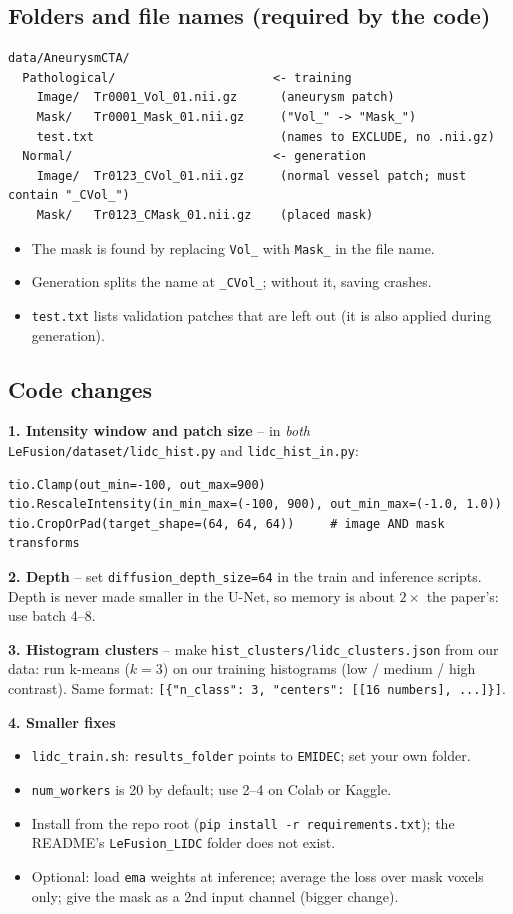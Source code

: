 \documentclass[11pt,a4paper]{article}
\begin{document}
\subsection{Folders and file names (required by the code)}
\begin{verbatim}
data/AneurysmCTA/
  Pathological/                      <- training
    Image/  Tr0001_Vol_01.nii.gz      (aneurysm patch)
    Mask/   Tr0001_Mask_01.nii.gz     ("Vol_" -> "Mask_")
    test.txt                          (names to EXCLUDE, no .nii.gz)
  Normal/                            <- generation
    Image/  Tr0123_CVol_01.nii.gz     (normal vessel patch; must contain "_CVol_")
    Mask/   Tr0123_CMask_01.nii.gz    (placed mask)
\end{verbatim}
\begin{itemize}
  \item The mask is found by replacing \texttt{Vol\_} with \texttt{Mask\_} in the file name.
  \item Generation splits the name at \texttt{\_CVol\_}; without it, saving crashes.
  \item \texttt{test.txt} lists validation patches that are left out (it is also applied during generation).
\end{itemize}

\subsection{Code changes}
\textbf{1. Intensity window and patch size} -- in \emph{both} \texttt{LeFusion/dataset/lidc\_hist.py} and \texttt{lidc\_hist\_in.py}:
\begin{verbatim}
tio.Clamp(out_min=-100, out_max=900)
tio.RescaleIntensity(in_min_max=(-100, 900), out_min_max=(-1.0, 1.0))
tio.CropOrPad(target_shape=(64, 64, 64))     # image AND mask transforms
\end{verbatim}
\textbf{2. Depth} -- set \texttt{diffusion\_depth\_size=64} in the train and inference scripts. Depth is never made smaller in the U-Net, so memory is about $2\times$ the paper's: use batch 4--8.

\textbf{3. Histogram clusters} -- make \texttt{hist\_clusters/lidc\_clusters.json} from our data: run k-means ($k=3$) on our training histograms (low / medium / high contrast). Same format: \texttt{[\{"n\_class": 3, "centers": [[16 numbers], ...]\}]}.

\textbf{4. Smaller fixes}
\begin{itemize}
  \item \texttt{lidc\_train.sh}: \texttt{results\_folder} points to \texttt{EMIDEC}; set your own folder.
  \item \texttt{num\_workers} is 20 by default; use 2--4 on Colab or Kaggle.
  \item Install from the repo root (\texttt{pip install -r requirements.txt}); the README's \texttt{LeFusion\_LIDC} folder does not exist.
  \item Optional: load \texttt{ema} weights at inference; average the loss over mask voxels only; give the mask as a 2nd input channel (bigger change).
\end{itemize}
\end{document}

